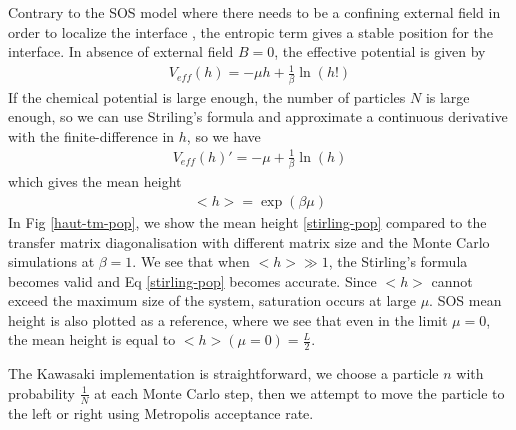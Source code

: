 Contrary to the SOS model where there needs to be a confining external field in order to localize the interface \cite{burkhardt_localisation-delocalisation_1981,chui_pinning_1981}, the entropic term gives a stable position for the interface. In absence of external field $B=0$, the effective potential is given by
\begin{align} 
    V_{eff}(h) = - \mu h + \frac{1}{\beta}\ln(h!)
\end{align}
If the chemical potential is large enough, the number of particles $N$ is large enough, so we can use Striling's formula and approximate a continuous derivative with the finite-difference in $h$, so we have
\begin{align} 
    V_{eff}(h)' = - \mu +\frac{1}{\beta} \ln(h)
\end{align}which gives the mean height 
\begin{align} 
    <h> = \exp(\beta \mu) 
\label{stirling-pop}
    \end{align}
    In Fig \ref{haut-tm-pop}, we show the mean height \eqref{stirling-pop} compared to the transfer matrix diagonalisation with different matrix size and the Monte Carlo simulations at $\beta=1$. We see that when $ <h> \gg 1$, the Stirling's formula becomes valid and Eq \eqref{stirling-pop} becomes accurate. Since $<h>$ cannot exceed the maximum size of the system, saturation occurs at large $\mu$. SOS mean height is also plotted as a reference, where we see that even in the limit $\mu=0$, the mean height is equal to $<h>(\mu=0) = \frac{L}{2}$.

The Kawasaki implementation is straightforward, we choose a particle $n$ with probability $\frac{1}{N}$ at each Monte Carlo step, then we attempt to move the particle to the left or right using Metropolis acceptance rate.

